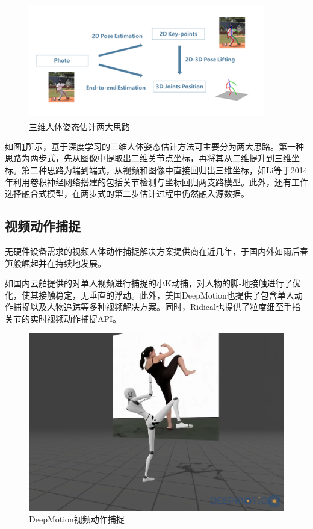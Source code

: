 \begin{figure}[h]
	\centering
	\includegraphics[scale=1]{figures/6.png}
	\caption{三维人体姿态估计两大思路\textsuperscript{\cite{20}}}
	\label{fig:f6}
\end{figure}

如图\ref{fig:f6}所示，基于深度学习的三维人体姿态估计方法可主要分为两大思路。第一种思路为两步式，先从图像中提取出二维关节点坐标，再将其从二维提升到三维坐标。第二种思路为端到端式，从视频和图像中直接回归出三维坐标，如Li等于2014年利用卷积神经网络搭建的包括关节检测与坐标回归两支路模型。此外，还有工作选择融合式模型，在两步式的第二步估计过程中仍然融入源数据。

\subsection{视频动作捕捉}{}
无硬件设备需求的视频人体动作捕捉解决方案提供商在近几年，于国内外如雨后春笋般崛起并在持续地发展。

如国内云舶提供的对单人视频进行捕捉的小K动捕，对人物的脚-地接触进行了优化，使其接触稳定，无垂直的浮动。此外，美国DeepMotion也提供了包含单人动作捕捉以及人物追踪等多种视频解决方案。同时，Ridical也提供了粒度细至手指关节的实时视频动作捕捉API。

\begin{figure}[h]
	\centering
	\includegraphics[scale=0.4]{figures/7.png}
	\caption{DeepMotion视频动作捕捉}
	\label{fig:f7}
\end{figure}



